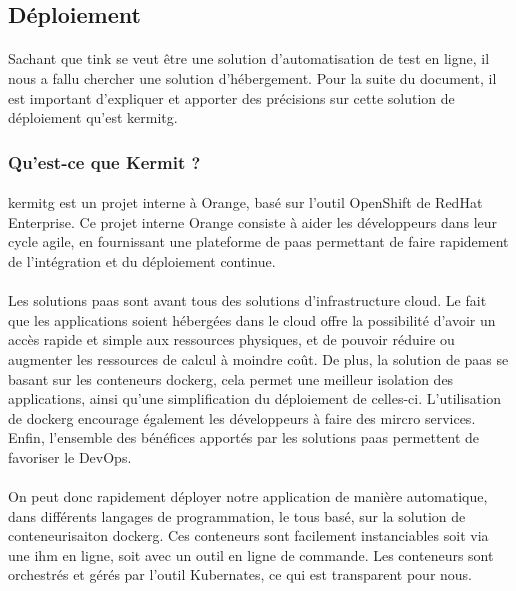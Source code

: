 \documentclass[12pt,a4paper]{report}
\begin{document}
\subsection{Déploiement}
\paragraph*{}Sachant que \gls{tink} se veut être une solution d'automatisation de test en ligne, il nous a fallu chercher une solution d'hébergement. Pour la suite du document, il est important d'expliquer et apporter des précisions sur cette solution de déploiement qu'est \gls{kermitg}. \\
\subsubsection{Qu'est-ce que Kermit ?}
\paragraph*{} \gls{kermitg} est un projet interne à Orange, basé sur l'outil OpenShift de RedHat Enterprise. Ce projet interne Orange consiste à aider les développeurs dans leur cycle agile, en fournissant une plateforme de \gls{paas} permettant de faire rapidement de l'intégration et du déploiement continue. 
\paragraph*{}Les solutions \gls{paas} sont avant tous des solutions d'infrastructure cloud. Le fait que les applications soient hébergées dans le cloud offre la possibilité d'avoir un accès rapide et simple aux ressources physiques, et de pouvoir réduire ou augmenter les ressources de calcul à moindre coût. De plus, la solution de \gls{paas} se basant sur les conteneurs \gls{dockerg}, cela permet une meilleur isolation des applications, ainsi qu'une simplification du déploiement de celles-ci. L'utilisation de \gls{dockerg} encourage également les développeurs à faire des mircro services. Enfin, l'ensemble des bénéfices apportés par les solutions \gls{paas} permettent de favoriser le DevOps.
\paragraph*{}On peut donc rapidement déployer notre application de manière automatique, dans différents langages de programmation, le tous basé, sur la solution de conteneurisaiton \gls{dockerg}. Ces conteneurs sont facilement instanciables soit via une \gls{ihm} en ligne, soit avec un outil en ligne de commande. Les conteneurs sont orchestrés et gérés par l'outil Kubernates, ce qui est transparent pour nous. \\
\end{document}

